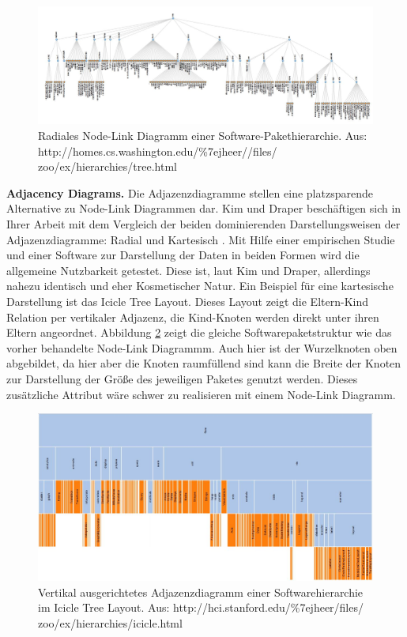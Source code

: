 \documentclass[draft=false
              ,paper=a4
              ,twoside=false
              ,fontsize=11pt
              ,headsepline
              ,BCOR10mm
              ,DIV11
              ]{scrbook}
\begin{document}
\begin{figure}[htbp]
  \centering
  \includegraphics[width=\textwidth]{img/nodelink}
  \caption{Radiales Node-Link Diagramm einer Software-Pakethierarchie. Aus: http://homes.cs.washington.edu/\%7ejheer//files/ \newline zoo/ex/hierarchies/tree.html}
  \label{fig:nodelink}
\end{figure}

\textbf{Adjacency Diagrams.} Die Adjazenzdiagramme stellen eine platzsparende Alternative zu Node-Link Diagrammen dar. Kim und Draper beschäftigen sich in Ihrer Arbeit mit dem Vergleich der beiden dominierenden Darstellungsweisen der Adjazenzdiagramme: Radial und Kartesisch \cite{Kim:2014:RVC:2636240.2636871}. Mit Hilfe einer empirischen Studie und einer Software zur Darstellung der Daten in beiden Formen wird die allgemeine Nutzbarkeit getestet. Diese ist, laut Kim und Draper, allerdings nahezu identisch und eher Kosmetischer Natur. 
Ein Beispiel für eine kartesische Darstellung ist das Icicle Tree Layout. Dieses Layout zeigt die Eltern-Kind Relation per vertikaler Adjazenz, die Kind-Knoten werden direkt unter ihren Eltern angeordnet. Abbildung \ref{fig:icicle} zeigt die gleiche Softwarepaketstruktur wie das vorher behandelte Node-Link Diagrammm. Auch hier ist der Wurzelknoten oben abgebildet, da hier aber die Knoten raumfüllend sind kann die Breite der Knoten zur Darstellung der Größe des jeweiligen Paketes genutzt werden. Dieses zusätzliche Attribut wäre schwer zu realisieren mit einem Node-Link Diagramm.
\begin{figure}[htbp]
  \centering
  \includegraphics[width=\textwidth]{img/icicle}
  \caption{Vertikal ausgerichtetes Adjazenzdiagramm einer Softwarehierarchie im Icicle Tree Layout. Aus: http://hci.stanford.edu/\%7ejheer/files/ \newline zoo/ex/hierarchies/icicle.html}
  \label{fig:icicle}
 \end{figure} 
\end{document}
